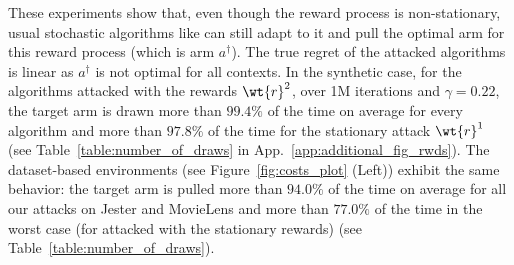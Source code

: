These experiments show that, even though the reward process is non-stationary,  usual stochastic algorithms like \linucb can still adapt to it and pull the optimal arm for this reward process (which is arm $a^{\dagger}$). The true regret of the attacked algorithms is linear as $a^{\dagger}$ is not optimal for all contexts. %
In the synthetic case, for the algorithms attacked with the rewards $\wt{r}^{2}$, over 1M iterations and $\gamma = 0.22$, the target arm is drawn more than $99.4\%$ of the time on average for every algorithm and more than $97.8\%$ of the time for the stationary attack $\wt{r}^1$ (see Table~\ref{table:number_of_draws} in App.~\ref{app:additional_fig_rwds}). The dataset-based environments (see Figure~\ref{fig:costs_plot} (Left)) exhibit the same behavior: the target arm is pulled more than $94.0\%$ of the time on average for all our attacks on Jester and MovieLens and more than $77.0\%$ of the time in the worst case (for \lints attacked with the stationary rewards) (see Table~\ref{table:number_of_draws}).

